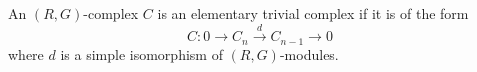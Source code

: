 An $(R, G)$-complex $C$ is an elementary trivial complex if it is of the form
$$C: 0 \to C_n \xrightarrow{d} C_{n-1} \to 0$$
where $d$ is a simple isomorphism of $(R, G)$-modules.
